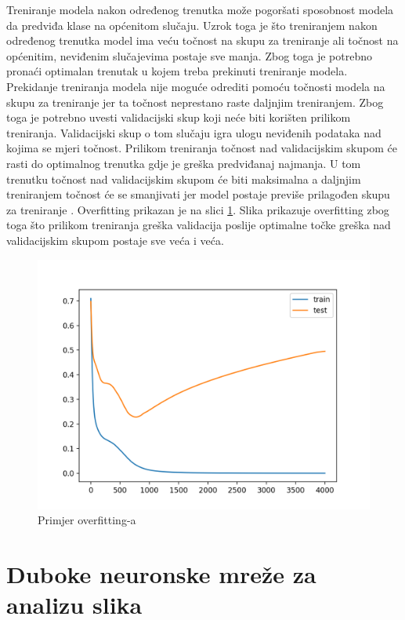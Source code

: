\documentclass[times, utf8, zavrsni,numeric,pstricks]{fer}
\begin{document}
Treniranje modela nakon određenog trenutka može pogoršati sposobnost modela da predviđa klase na općenitom slučaju. Uzrok toga je što treniranjem nakon određenog trenutka model ima veću točnost na skupu za treniranje ali točnost na općenitim, neviđenim slučajevima postaje sve manja. Zbog toga je potrebno pronaći optimalan trenutak u kojem treba prekinuti treniranje modela. Prekidanje treniranja modela nije moguće odrediti pomoću točnosti modela na skupu za treniranje jer ta točnost neprestano raste daljnjim treniranjem. Zbog toga je potrebno uvesti validacijski skup koji neće biti korišten prilikom treniranja. Validacijski skup o tom slučaju igra ulogu neviđenih podataka nad kojima se mjeri točnost. Prilikom treniranja točnost nad validacijskim skupom će rasti do optimalnog trenutka gdje je greška predviđanaj najmanja. U tom trenutku točnost nad validacijskim skupom će biti maksimalna a daljnjim treniranjem točnost će se smanjivati jer model postaje previše prilagođen skupu za treniranje . Overfitting prikazan je na slici \ref{pic:overfitting}. Slika prikazuje overfitting zbog toga što prilikom treniranja greška validacija poslije optimalne točke greška nad validacijskim skupom postaje sve veća i veća.

\begin{figure}[H]
	\centering
	\includegraphics[width=\linewidth, height=0.3\paperheight, keepaspectratio]{overfitting.png}
	\caption{Primjer overfitting-a}
	\label{pic:overfitting}
\end{figure}


\section{Duboke neuronske mreže za analizu slika}
\end{document}
